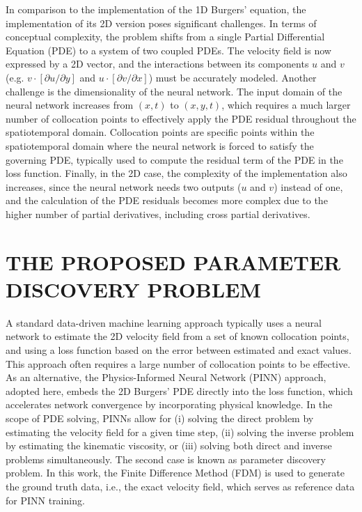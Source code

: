 \documentclass[12pt,fleqn]{article}
\begin{document}
In comparison to the implementation of the 1D Burgers' equation, the implementation of its 2D version poses significant challenges. In terms of conceptual complexity, the problem shifts from a single Partial Differential Equation (PDE) to a system of two coupled PDEs. The velocity field is now expressed by a 2D vector, and the interactions between its components $u$ and $v$ (e.g. $v \cdot [{\partial u}/{\partial y}]$ and $u \cdot [{\partial v}/{\partial x}]$) must be accurately modeled. Another challenge is the dimensionality of the neural network. The input domain of the neural network increases from $(x, t)$ to $(x, y, t)$, which requires a much larger number of collocation points to effectively apply the PDE residual throughout the spatiotemporal domain. 
Collocation points are specific points within the spatiotemporal domain where the neural network is forced to satisfy the governing PDE, typically used to compute the residual term of the PDE in the loss function. 
Finally, in the 2D case, the complexity of the implementation also increases, since the neural network needs two outputs ($u$ and $v$) instead of one, and the calculation of the PDE residuals becomes more complex due to the higher number of partial derivatives, including cross partial derivatives.


\section{THE PROPOSED PARAMETER DISCOVERY PROBLEM}

A standard data-driven machine learning approach typically uses a neural network to estimate the 2D velocity field from a set of known collocation points, and using a loss function based on the error between estimated and exact values. This approach often requires a large number of collocation points to be effective. As an alternative, the Physics-Informed Neural Network (PINN) approach, adopted here, embeds the 2D Burgers' PDE directly into the loss function, which accelerates network convergence by incorporating physical knowledge. In the scope of PDE solving, PINNs allow for (i) solving the direct problem by estimating the velocity field for a given time step, (ii) solving the inverse problem by estimating the kinematic viscosity, or (iii) solving both direct and inverse problems simultaneously. The second case is known as parameter discovery problem. In this work, the Finite Difference Method (FDM) is used to generate the ground truth data, i.e., the exact velocity field, which serves as reference data for PINN training.
\end{document}
